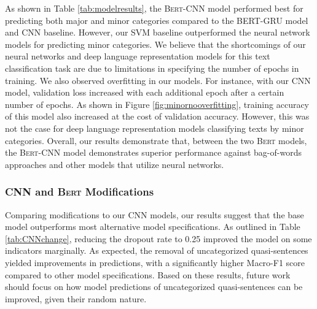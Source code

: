 \documentclass[11pt]{article}
\begin{document}


As shown in Table \ref{tab:modelresults}, the \textsc{Bert}-CNN model performed best for predicting both major and minor categories compared to the BERT-GRU model and CNN baseline. However, our SVM baseline outperformed the neural network models for predicting minor categories. We believe that the shortcomings of our neural networks and deep language representation models for this text classification task are due to limitations in specifying the number of epochs in training. We also observed overfitting in our models. For instance, with our CNN model, validation loss increased with each additional epoch after a certain number of epochs.
As shown in Figure \ref{fig:minornooverfitting}, training accuracy of this model also increased at the cost of validation accuracy.
However, this was not the case for deep language representation models classifying texts by minor categories. Overall, our results demonstrate that, between the two \textsc{Bert} models, the \textsc{Bert}-CNN model demonstrates superior performance against bag-of-words approaches and other models that utilize neural networks.

\subsubsection*{CNN and \textsc{Bert} Modifications}
Comparing modifications to our CNN models, our results suggest that the base model outperforms most alternative model specifications. As outlined in Table \ref{tab:CNNchange}, reducing the dropout rate to 0.25 improved the model on some indicators marginally. As expected, the removal of uncategorized quasi-sentences yielded improvements in predictions, with a significantly higher Macro-F1 score compared to other model specifications. Based on these results, future work should focus on how model predictions of uncategorized quasi-sentences can be improved, given their random nature.
\end{document}
